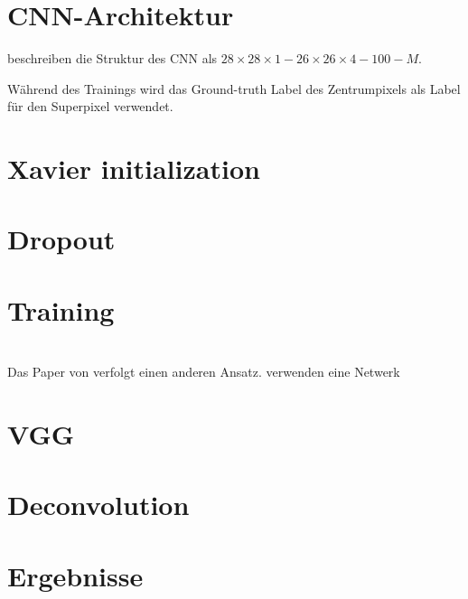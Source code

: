 \section{CNN-Architektur}
\citeauthor{ChenConvolutionalNeuralNetworks2017a} beschreiben die Struktur
des CNN als \(28 \times 28 \times 1 - 26 \times 26 \times 4 - 100 - M\).

Während des Trainings wird das Ground-truth Label des Zentrumpixels als Label für den Superpixel verwendet.


\section{Xavier initialization}


\section{Dropout}



\section{Training}


\section{\textcite{XuPageSegmentationHistorical2017}}
Das Paper  von \citeauthor*{XuPageSegmentationHistorical2017} verfolgt einen anderen Ansatz.
\citeauthor{XuPageSegmentationHistorical2017} verwenden eine Netwerk  


\section{VGG}
\section{Deconvolution}
\section{Ergebnisse}